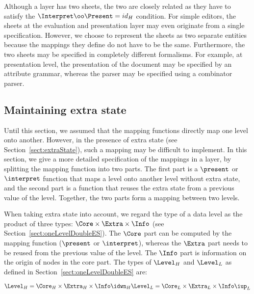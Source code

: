 Although a layer has two sheets, the two are closely related as they have to satisfy the
$\Interpret \oo \Present = id_{H}$ condition. For simple editors, the sheets at the evaluation and presentation layer may even originate from a single specification. However, we choose to represent the sheets as two separate entities because the mappings they define do not have to be the same.  Furthermore, the two sheets may be specified in completely different formalisms. For example, at presentation level, the presentation of the document may be specified by an attribute grammar, whereas the parser may be specified using a combinator parser\cite{combinatorparser}.



%																
%																
%																
\subsection{Maintaining extra state} \label{sect:maintainingExtraState}

Until this section, we assumed that the mapping functions directly map one level onto another. However, in the presence of extra state (see Section~\ref{sect:extraState}), such a mapping may be difficult to implement. In this section, we give a more detailed specification of the mappings in a layer, by splitting the mapping function into two parts. The first part is a $\present$ or $\interpret$ function that maps a level onto another level without extra state, and the second part is a function that reuses the extra state from a previous value of the level. Together, the two parts form a mapping between two levels.

When taking extra state into account, we regard the type of a data level as the product of three types: 
$\Core \times \Extra \times \Info$ (see Section~\ref{sect:oneLevelDoubleES}). The $\Core$ part can be computed by the mapping function ($\present$ or $\interpret$), whereas the $\Extra$ part needs to be reused from the previous value of the level. The $\Info$ part is information on the origin of nodes in the core part. The types of $\Level_{H}$ and $\Level_{L}$ as defined in Section~\ref{sect:oneLevelDoubleES} are: 

\begin{small}\begin{math} 
\Level_{H} = \Core_{H} \times \Extra_{H} \times \Info\idwn_{H}\\
\Level_{L} = \Core_{L} \times \Extra_{L} \times \Info\iup_{L}\\
\end{math}\end{small}

